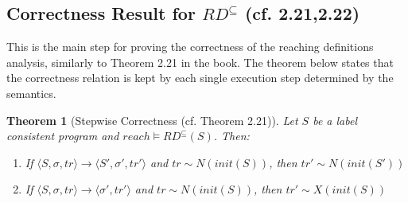 \documentclass[a4wide,12pt]{article}
\theoremstyle{definition}
\theoremstyle{plain}
\newtheorem{theo}{Theorem}
\theoremstyle{remark}
\def\const#1{\mathopen{\langle}#1\mathclose{\rangle}} %
\def\pair#1{\const{#1}}
\begin{document}
\subsection*{Correctness Result for $RD^\subseteq$ (cf. 2.21,2.22)}

This is the main step for proving the correctness
of the reaching definitions analysis, similarly to Theorem 2.21 in the book.
The theorem below states that the correctness
relation is kept by each single execution step
determined by the semantics.

\begin{theo}[Stepwise Correctness (cf. Theorem 2.21)]
\label{theo221}
Let $S$ be a label consistent program and $reach \models RD^{\subseteq}(S)$. Then:
\begin{enumerate}
\item If $\pair{S,\sigma, tr} \to \pair{S', \sigma', tr'}$ and $tr \sim N(init(S))$, then $tr' \sim N(init(S'))$
\item If $\pair{S,\sigma, tr} \to \pair{\sigma', tr'}$ and $tr \sim N(init(S))$, then $tr' \sim X(init(S))$
\end{enumerate}
\end{theo}
\end{document}
